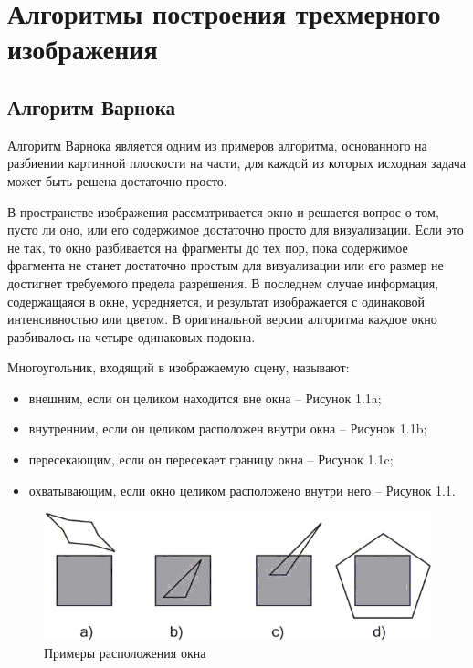 \documentclass[12pt,a4paper,oneside]{report}
\begin{document}
	\section{Алгоритмы построения трехмерного изображения}
	
	\subsection{Алгоритм Варнока}
	
	 \quad Алгоритм Варнока является одним из примеров алгоритма, основанного на разбиении картинной плоскости на части, для каждой из которых исходная задача может быть решена достаточно просто\cite{f}. 
	
	 В пространстве изображения рассматривается окно и решается вопрос о том, пусто ли оно, или его содержимое достаточно просто для визуализации. Если это не так, то окно разбивается на фрагменты до тех пор, пока содержимое фрагмента не станет достаточно простым для визуализации или его размер не достигнет требуемого предела разрешения. В последнем случае информация, содержащаяся в окне, усредняется, и результат изображается с одинаковой интенсивностью или цветом. В оригинальной версии алгоритма каждое окно разбивалось на четыре одинаковых подокна. 
	
	 Многоугольник, входящий в изображаемую сцену, называют:
	\begin{itemize}
		\item внешним, если он целиком находится вне окна – Рисунок 1.1a;
		\item внутренним, если он целиком расположен внутри окна – Рисунок 1.1b;
		\item пересекающим, если он пересекает границу окна – Рисунок 1.1c;
		\item охватывающим, если окно целиком расположено внутри него – Рисунок 1.1.
	\end{itemize}
	
	\begin{figure}[h]
		\centering
		\includegraphics[scale=0.6]{varnok}
		\caption{Примеры расположения окна}
	\end{figure}
\end{document}
